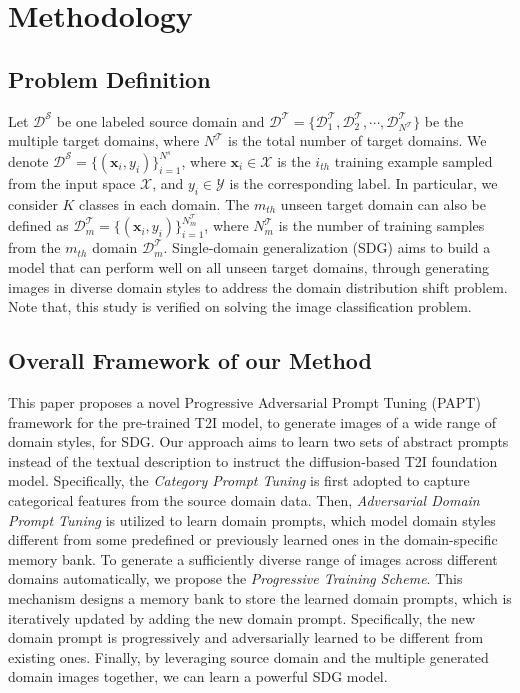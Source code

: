 \section{Methodology}
 
\subsection{Problem Definition} 
Let $\mathcal{D}^\mathcal{S}$ be one labeled source domain and $\mathcal{D}^\mathcal{T}=\{\mathcal{D}_{1}^\mathcal{T},\mathcal{D}_{2}^\mathcal{T},\cdots,\mathcal{D}_{N^\mathcal{T}}^\mathcal{T}\}$ be the multiple target domains, where $N^\mathcal{T}$ is the total number of target domains. 
We denote $\mathcal{D}^\mathcal{S}=\{(\mathbf{x}_i,y_i)\}_{i=1}^{N^s}$, where $\mathbf{x}_i \in \mathcal{X}$ is the $i_{th}$ training example sampled from the input space $\mathcal{X}$, and $y_i \in \mathcal{Y}$ is the corresponding label. In particular, we consider $K$ classes in each domain. 
The $m_{th}$ unseen target domain can also be defined as $\mathcal{D}_{m}^\mathcal{T}=\{(\mathbf{x}_i,y_i)\}_{i=1}^{N^\mathcal{T}_{m}}$, where $N^\mathcal{T}_{m}$ is the number of training samples from the $m_{th}$ domain $\mathcal{D}_{m}^\mathcal{T}$.
Single-domain generalization (SDG) aims to build a model that can perform well on all unseen target domains, through generating images in diverse domain styles to address the domain distribution shift problem.
Note that, this study is verified on solving the image classification problem.


\subsection{Overall Framework of our Method}
This paper proposes a novel Progressive Adversarial Prompt Tuning (PAPT) framework for the pre-trained T2I model, to generate images of a wide range of domain styles, for SDG. 
Our approach aims to learn two sets of abstract prompts instead of the textual description to instruct the diffusion-based T2I foundation model. 
Specifically, the \emph{Category Prompt Tuning} is first adopted to capture categorical features from the source domain data. 
Then, \emph{Adversarial Domain Prompt Tuning} is utilized to learn domain prompts, which model domain styles different from some predefined or previously learned ones in the domain-specific memory bank. 
To generate a sufficiently diverse range of images across different domains automatically, we propose the \emph{Progressive Training Scheme}. 
This mechanism designs a memory bank to store the learned domain prompts, which is iteratively updated by adding the new domain prompt. Specifically, the new domain prompt is progressively and adversarially learned to be different from existing ones.
Finally, by leveraging source domain and the multiple generated domain images together, we can learn a powerful SDG model.


